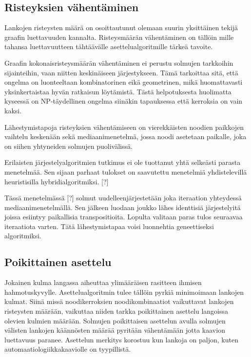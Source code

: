\documentclass[finnish,12pt]{article}
\begin{document}
		\subsection{Risteyksien vähentäminen}

Lankojen risteysten määrä on osoittautunut olemaan suurin yksittäinen tekijä graafin luettavuuden kannalta. \cite{RefWorks:47}
Risteysmäärän vähentäminen on tällöin mille tahansa luettavuutteen tähtäävälle asettelualgoritmille tärkeä tavoite.

Graafin kokonaisristeysmäärän vähentäminen ei perustu solmujen tarkkoihin sijainteihin, vaan niitten keskinäiseen järjestykseen. Tämä tarkoittaa sitä, että ongelma on luonteeltaan kombinatorinen eikä geometrinen, mikä huomattavasti yksinkertaistaa hyvän ratkaisun löytämistä.
Tästä helpotuksesta huolimatta kyseessä on NP-täydellinen ongelma siinäkin tapauksessa että kerroksia on vain kaksi. \cite{RefWorks:40}

Lähestymistapoja risteyksien vähentämiseen on vierekkäisten noodien paikkojen
vaihtelu keskenään sekä mediaanimenetelmä, jossa noodi asetetaan paikalle, joka
on siihen yhtyneiden solmujen puolivälissä.


Erilaisten järjestelyalgoritmien tutkimus ei ole tuottanut yhtä selkeästi parasta menetelmää.
Sen sijaan parhaat tulokset on saavutettu menetelmiä yhdistelevillä heuristisilla hybridialgoritmiksi. [?]

Tässä menetelmässä [?] solmut uudelleenjärjestetään joka iteraation yhteydessä mediaanimenetelmällä.
Sen jälkeen luodaan joukko lähes identtisiä järjestelyitä joissa esiintyy paikallisia transpositioita.
Lopulta valitaan paras tulos seuraavaa iteraatiota varten.
Tätä lähestymistapaa voisi luonnehtia geneettiseksi algoritmiksi.


		\subsection{Poikittainen asettelu}

Jokainen kulma langassa aiheuttaa ylimääräisen rasitteen ihmisen hahmotuskyvylle. \cite{RefWorks:47}
Asettelualgoritmin tulee tällöin pyrkiä minimoimaan lankojen kulmat.
Siinä missä noodikerroksien noodikombinaatiot vaikuttavat lankojen risteysten määrään, vaikuttaa niiden tarkka poikittainen asettelu langoissa olevien kulmien määrään.
Solmujen poikittaisen asettelun avulla solmujen välisten lankojen käännösten määrää pyritään vähentämään jotta kaavion luettavuus paranee.
Asettelun merkitys korostuu kun lankoja on paljon, kuten automaatiologiikkakaaviolle on tyypillistä.
\end{document}
